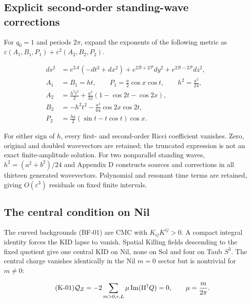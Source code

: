 \subsection{Explicit second-order standing-wave corrections}

For $q_0=1$ and periods $2\pi$, expand the exponents of the following metric as $\varepsilon(A_1,B_1,P_1)+\varepsilon^2(A_2,B_2,P_2)$.

\begin{equation}\tag{W-04}\label{eq:W-04}
\begin{aligned}
ds^2&=e^{2\mathcal A}(-dt^2+dx^2)+e^{2\mathcal B+2\mathcal P}dy^2+e^{2\mathcal B-2\mathcal P}dz^2,\\
A_1&=B_1=ht,\qquad P_1=\frac a2\cos x\cos t,\qquad h^2=\frac{a^2}{24},\\
A_2&=\frac{h^2t^2}{2}+\frac{a^2}{32}(1-\cos2t-\cos2x),\\
B_2&=-h^2t^2-\frac{a^2}{64}\cos2x\cos2t,\\
P_2&=\frac{ha}{2}(\sin t-t\cos t)\cos x.
\end{aligned}
\end{equation}

For either sign of $h$, every first- and second-order Ricci coefficient vanishes. Zero, original and doubled wavevectors are retained; the truncated expression is not an exact finite-amplitude solution. For two nonparallel standing waves, $h^2=(a^2+b^2)/24$ and Appendix D constructs sources and corrections in all thirteen generated wavevectors. Polynomial and resonant time terms are retained, giving $O(\varepsilon^3)$ residuals on fixed finite intervals.

\subsection{The central condition on Nil}

The curved backgrounds (BF-01) are CMC with $K_{ij}K^{ij}>0$. A compact integral identity forces the KID lapse to vanish. Spatial Killing fields descending to the fixed quotient give one central KID on Nil, none on Sol and four on Taub $S^3$. The central charge vanishes identically in the Nil $m=0$ sector but is nontrivial for $m\ne0$:

\begin{equation}\tag{K-01}\label{eq:K-01}
\mathcal Q_Z=-2\sum_{m>0,r,L}\mu\thinspace\mathrm{Im}(\Pi^\dagger Q)=0,
\qquad \mu=\frac{m}{2\pi}.
\end{equation}

